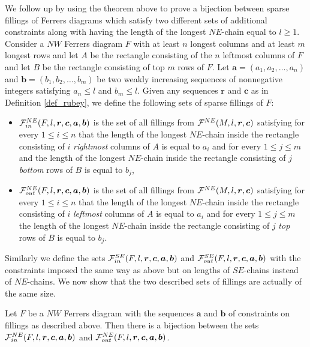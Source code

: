 We follow up by using the theorem above to prove a bijection between sparse fillings of Ferrers diagrams which satisfy
two different sets of additional constraints along with having the length of the longest $NE$-chain equal to $l \geq 1$.
Consider a $NW$ Ferrers diagram $F$ with at least $n$ longest columns and at least $m$ longest rows and let $A$
be the rectangle consisting of the $n$ leftmost columns of $F$ and let $B$ be the rectangle consisting of top $m$ rows of $F$.
Let $\bm{a} = (a_1, a_2, \ldots, a_n)$ and $\bm{b} = (b_1, b_2, \ldots, b_m)$ be two weakly increasing sequences of nonnegative integers satisfying
$a_n \leq l$ and $b_m \leq l$. Given any sequences $\bm{r}$ and $\bm{c}$ as in Definition \ref{def_rubey}, we define the following
sets of sparse fillings of $F$:
\begin{itemize}
\item $\mathcal{F}^{NE}_{in}(F, l, \bm{r}, \bm{c}, \bm{a}, \bm{b})$ is the set of all fillings from
$\mathcal{F}^{NE}(M, l, \bm{r}, \bm{c})$ satisfying for every $1 \leq i \leq n$ that the length of the longest $NE$-chain inside the
rectangle consisting of $i$ \emph{rightmost} columns of $A$ is equal to $a_i$ and for every $1 \leq j \leq m$ and the length of the longest $NE$-chain 
inside the rectangle consisting of $j$ \emph{bottom} rows of $B$ is equal to $b_j$,

\item $\mathcal{F}^{NE}_{out}(F, l, \bm{r}, \bm{c}, \bm{a}, \bm{b})$ is the set of all fillings from
$\mathcal{F}^{NE}(M, l, \bm{r}, \bm{c})$ satisfying for every $1 \leq i \leq n$ that the length of the longest $NE$-chain inside
the rectangle consisting of $i$ \emph{leftmost} columns of $A$ is equal to $a_i$ and for every $1 \leq j \leq m$ the length of the longest $NE$-chain 
inside the rectangle consisting of $j$ \emph{top} rows of $B$ is equal to $b_j$.
\end{itemize}

Similarly we define the sets $\mathcal{F}^{SE}_{in}(F,l, \bm{r}, \bm{c}, \bm{a}, \bm{b})$ and $\mathcal{F}^{SE}_{out}(F,l, \bm{r}, \bm{c}, \bm{a}, \bm{b})$
with the constraints imposed the same way as above but on lengths of $SE$-chains instead of $NE$-chains.
We now show that the two described sets of fillings are actually of the same size.

\begin{lemma} \label{lemma_constraints}
Let $F$ be a $NW$ Ferrers diagram with the sequences $\bm{a}$ and $\bm{b}$ of constraints on fillings as described above. Then
there is a bijection between the sets $\mathcal{F}^{NE}_{in}(F, l, \bm{r}, \bm{c}, \bm{a}, \bm{b})$ and $\mathcal{F}^{NE}_{out}(F, l, \bm{r}, \bm{c}, \bm{a}, \bm{b})$.
\end{lemma}

